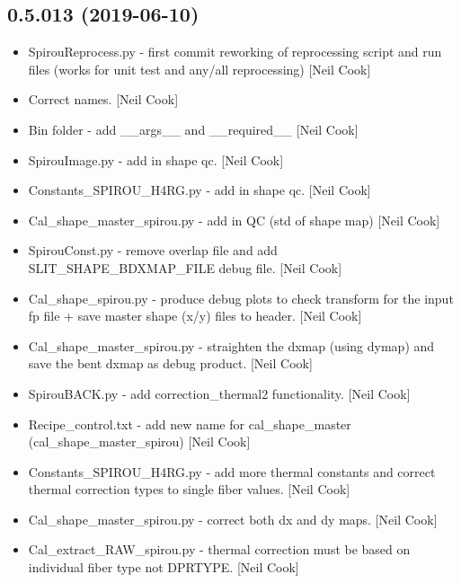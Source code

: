 \documentclass[a4paper,10pt,english]{report}
\begin{document}
\subsection{0.5.013 (2019-06-10)}
\label{\detokenize{misc/changelog:id122}}\begin{itemize}
\item {} 
SpirouReprocess.py - first commit reworking of reprocessing script and
run files (works for unit test and any/all reprocessing) {[}Neil Cook{]}

\item {} 
Correct names. {[}Neil Cook{]}

\item {} 
Bin folder - add \_\_args\_\_ and \_\_required\_\_ {[}Neil Cook{]}

\item {} 
SpirouImage.py - add in shape qc. {[}Neil Cook{]}

\item {} 
Constants\_SPIROU\_H4RG.py - add in shape qc. {[}Neil Cook{]}

\item {} 
Cal\_shape\_master\_spirou.py - add in QC (std of shape map) {[}Neil Cook{]}

\item {} 
SpirouConst.py - remove overlap file and add SLIT\_SHAPE\_BDXMAP\_FILE
debug file. {[}Neil Cook{]}

\item {} 
Cal\_shape\_spirou.py - produce debug plots to check transform for the
input fp file + save master shape (x/y) files to header. {[}Neil Cook{]}

\item {} 
Cal\_shape\_master\_spirou.py - straighten the dxmap (using dymap) and
save the bent dxmap as debug product. {[}Neil Cook{]}

\item {} 
SpirouBACK.py - add correction\_thermal2 functionality. {[}Neil Cook{]}

\item {} 
Recipe\_control.txt - add new name for cal\_shape\_master
(cal\_shape\_master\_spirou) {[}Neil Cook{]}

\item {} 
Constants\_SPIROU\_H4RG.py - add more thermal constants and correct
thermal correction types to single fiber values. {[}Neil Cook{]}

\item {} 
Cal\_shape\_master\_spirou.py - correct both dx and dy maps. {[}Neil Cook{]}

\item {} 
Cal\_extract\_RAW\_spirou.py - thermal correction must be based on
individual fiber type not DPRTYPE. {[}Neil Cook{]}

\end{itemize}
\end{document}
